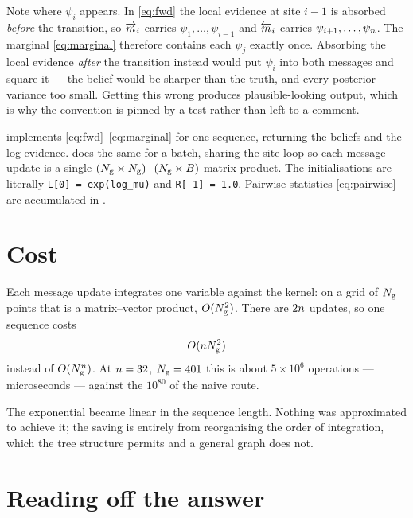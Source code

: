 \begin{pitfall}
Note where $\psi_i$ appears. In \eqref{eq:fwd} the local evidence at site $i-1$ is absorbed
\emph{before} the transition, so $\overrightarrow{m}_i$ carries $\psi_1,\dots,\psi_{i-1}$ and $\overleftarrow{m}_i$
carries $\psi_{i+1},\dots,\psi_{n}$. The marginal \eqref{eq:marginal} therefore contains
each $\psi_j$ exactly once. Absorbing the local evidence \emph{after} the transition instead
would put $\psi_i$ into both messages and square it --- the belief would be sharper than the
truth, and every posterior variance too small. Getting this wrong produces plausible-looking
output, which is why the convention is pinned by a test rather than left to a comment.
\end{pitfall}

\begin{codebox}
 implements \eqref{eq:fwd}--\eqref{eq:marginal} for one
sequence, returning the beliefs and the log-evidence.
 does the same for a batch, sharing the site loop so
each message update is a single $(N_{\mathrm{g}}\times N_{\mathrm{g}})\cdot(N_{\mathrm{g}}\times B)$ matrix product.
The initialisations are literally \texttt{L[0] = exp(log\_mu)} and \texttt{R[-1] = 1.0}.
Pairwise statistics \eqref{eq:pairwise} are accumulated in .
\end{codebox}

\section{Cost}

Each message update integrates one variable against the kernel: on a grid of $N_{\mathrm{g}}$ points
that is a matrix--vector product, $O(N_{\mathrm{g}}^2)$. There are $2n$ updates, so one sequence
costs
\begin{equation}
O(n N_{\mathrm{g}}^2)
\end{equation}
instead of $O(N_{\mathrm{g}}^{n})$. At $n=32$, $N_{\mathrm{g}}=401$ this is about $5\times10^6$
operations --- microseconds --- against the $10^{80}$ of the naive route.

\begin{intuition}
The exponential became linear in the sequence length. Nothing was approximated to achieve it;
the saving is entirely from reorganising the order of integration, which the tree structure
permits and a general graph does not.
\end{intuition}

\section{Reading off the answer}

